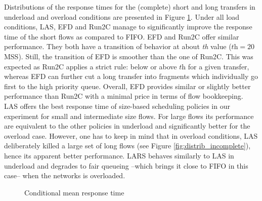 \documentclass[preprint,12pt]{elsarticle}
\begin{document}
Distributions of the response times for the (complete) short and long transfers in underload and overload conditions are presented in Figure \ref{fig:resp_time}. Under all load conditions, LAS, EFD and Run2C manage to significantly improve the response time of the short flows as compared to FIFO. EFD and Run2C offer similar performance. They both have a transition of behavior at about \textit{th} value ($\textit{th}=20$ MSS). Still, the transition of EFD is smoother than the one of Run2C. This was expected as Run2C applies a strict rule: below or above $\textit{th}$ for a given transfer, whereas EFD can further cut a long transfer into fragments which individually go first to the high priority queue. Overall, EFD provides similar or slightly better performance than Run2C with a minimal price in terms of flow bookkeeping. LAS offers the best response time of size-based scheduling policies in our experiment for small and intermediate size flows. For large flows its performance are equivalent to the other policies in underload and significantly better for the overload case. However, one has to keep in mind that in overload conditions, LAS deliberately killed a large set of long flows (see Figure \ref{fig:distrib_incomplete}), hence its apparent better performance.  LARS behaves similarly to LAS in underload and degrades to fair queueing --which brings it close to FIFO in this case-- when the networks is overloaded. 


\begin{figure}[ht]
  \centering
  \caption{Conditional mean response time}
  \label{fig:resp_time}
\end{figure}
\end{document}
